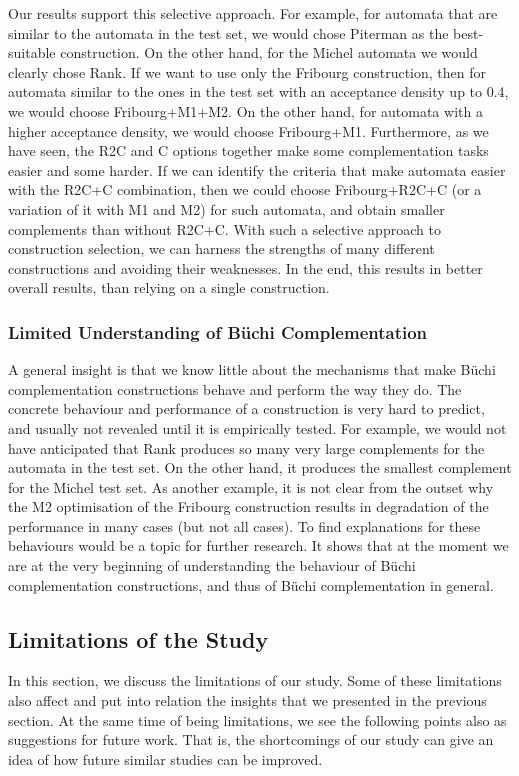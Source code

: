 Our results support this selective approach. For example, for automata that are similar to the automata in the \goal{} test set, we would chose Piterman as the best-suitable construction. On the other hand, for the Michel automata we would clearly chose Rank. If we want to use only the Fribourg construction, then for automata similar to the ones in the \goal{} test set with an acceptance density up to 0.4, we would choose Fribourg+M1+M2. On the other hand, for automata with a higher acceptance density, we would choose Fribourg+M1. Furthermore, as we have seen, the R2C and C options together make some complementation tasks easier and some harder. If we can identify the criteria that make automata easier with the R2C+C combination, then we could choose Fribourg+R2C+C (or a variation of it with M1 and M2) for such automata, and obtain smaller complements than without R2C+C. With such a selective approach to construction selection, we can harness the strengths of many different constructions and avoiding their weaknesses. In the end, this results in better overall results, than relying on a single construction.

\subsubsection{Limited Understanding of Büchi Complementation}
A general insight is that we know little about the mechanisms that make Büchi complementation constructions behave and perform the way they do. The concrete behaviour and performance of a construction is very hard to predict, and usually not revealed until it is empirically tested. For example, we would not have anticipated that Rank produces so many very large complements for the automata in the \goal{} test set. On the other hand, it produces the smallest complement for the Michel test set. As another example, it is not clear from the outset why the M2 optimisation of the Fribourg construction results in degradation of the performance in many cases (but not all cases). To find explanations for these behaviours would be a topic for further research. It shows that at the moment we are at the very beginning of understanding the behaviour of Büchi complementation constructions, and thus of Büchi complementation in general.




\subsection{Limitations of the Study}
\label{5_limitations}
In this section, we discuss the limitations of our study. Some of these limitations also affect and put into relation the insights that we presented in the previous section. At the same time of being limitations, we see the following points also as suggestions for future work. That is, the shortcomings of our study can give an idea of how future similar studies can be improved.

